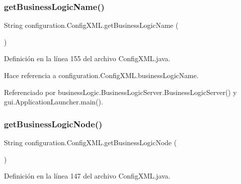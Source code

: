 \subsubsection{\texorpdfstring{getBusinessLogicName()}{getBusinessLogicName()}}
{\footnotesize\ttfamily String configuration.\+Config\+X\+M\+L.\+get\+Business\+Logic\+Name (\begin{DoxyParamCaption}{ }\end{DoxyParamCaption})}



Definición en la línea 155 del archivo Config\+X\+M\+L.\+java.


\begin{DoxyCode}{0}

\end{DoxyCode}


Hace referencia a configuration.\+Config\+X\+M\+L.\+business\+Logic\+Name.



Referenciado por business\+Logic.\+Business\+Logic\+Server.\+Business\+Logic\+Server() y gui.\+Application\+Launcher.\+main().

\mbox{\label{classconfiguration_1_1_config_x_m_l_a6a79b28dd9e0c1c755fef0e7435ec03a}} 
\subsubsection{\texorpdfstring{getBusinessLogicNode()}{getBusinessLogicNode()}}
{\footnotesize\ttfamily String configuration.\+Config\+X\+M\+L.\+get\+Business\+Logic\+Node (\begin{DoxyParamCaption}{ }\end{DoxyParamCaption})}



Definición en la línea 147 del archivo Config\+X\+M\+L.\+java.


\begin{DoxyCode}{0}

\end{DoxyCode}


